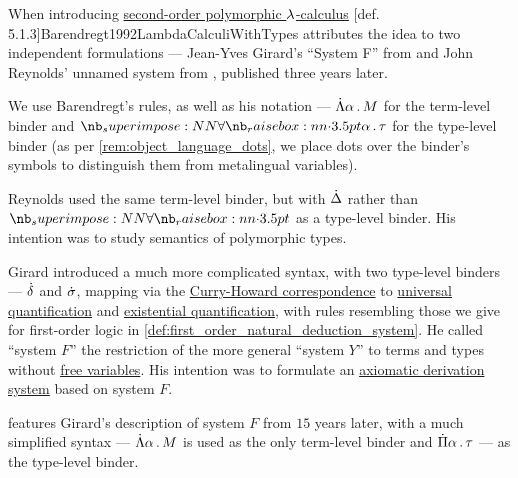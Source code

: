 \begin{remark}\label{rem:polymorphic_type_origin}
  When introducing \hyperref[def:polymorphic_typed_lambda_calculus]{second-order polymorphic \( {\mathrm \lambda} \)-calculus} [def. 5.1.3]{Barendregt1992LambdaCalculiWithTypes} attributes the idea to two independent formulations --- Jean-Yves Girard's \enquote{System F} from \cite{Girard1971SystèmeF} and John Reynolds' unnamed system from \cite{Reynolds1974TheoryOfTypeStructure}, published three years later.

  We use Barendregt's rules, as well as his notation --- \( \qAbs \alpha M \) for the term-level binder and \( \qpolytype \alpha \tau \) for the type-level binder (as per \cref{rem:object_language_dots}, we place dots over the binder's symbols to distinguish them from metalingual variables).

  Reynolds used the same term-level binder, but with \( \dot{\Delta} \) rather than \( \synforall \) as a type-level binder. His intention was to study semantics of polymorphic types.

  Girard introduced a much more complicated syntax, with two type-level binders --- \( \dot{\delta} \) and \( \dot{\sigma} \), mapping via the \hyperref[con:curry_howard_correspondence]{Curry-Howard correspondence} to \hyperref[def:predicate_logic_alphabet/quantifiers/universal]{universal quantification} and \hyperref[def:predicate_logic_alphabet/quantifiers/existential]{existential quantification}, with rules resembling those we give for first-order logic in \cref{def:first_order_natural_deduction_system}. He called \enquote{system \( F \)} the restriction of the more general \enquote{system \( Y \)} to terms and types without \hyperref[con:variable_binding]{free variables}. His intention was to formulate an \hyperref[def:axiomatic_derivation_system]{axiomatic derivation system} based on system \( F \).

  \cite[ch. 11]{GirardEtAl1989ProofsAndTypes} features Girard's description of system \( F \) from \( 15 \) years later, with a much simplified syntax --- \( \qAbs \alpha M \) is used as the only term-level binder and \( \qprod \alpha \tau \) --- as the type-level binder.
\end{remark}

